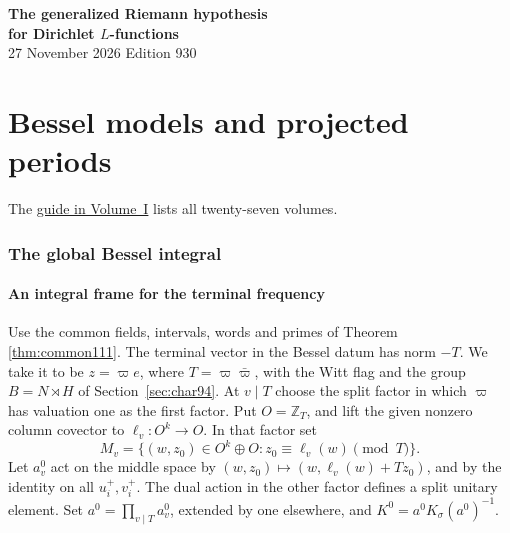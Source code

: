 \documentclass[a4paper,11pt]{article}
\theoremstyle{definition}
\theoremstyle{remark}
\newcommand{\ZZ}{\mathbb Z}\newcommand{\ord}{\operatorname{ord}}
\numberwithin{equation}{section}
\begin{document}
\setcounter{part}{16}
\thispagestyle{plain}\begin{center}
{\LARGE\bfseries The generalized Riemann hypothesis\\[2pt]for Dirichlet \(L\)-functions}\\[6pt]
{\small 27 November 2026 \quad\textperiodcentered\quad Edition 930}\end{center}
\part{Bessel models and projected periods}\label{part:XVII}
\begin{abstract}\noindent We construct Bessel functionals for specified characters and compact types. At split finite places we match sections of complementary ranks. For the prescribed auxiliary type we prove that an archimedean translation close to the identity gives zero on the original spherical rows when its other valuations are at good split primes. We give a different rational translation compatible with every marked exchange and every unmarked integral root. We compute the contribution of the normalized terminal input to the determinant of the signed period image.\end{abstract}
\setcounter{section}{85}
\noindent The \hyperref[seriesguide]{guide in Volume~I} lists all twenty-seven volumes.
\begingroup\small\setlength{\parskip}{0pt}\tableofcontents\endgroup
\clearpage

\section{The global Bessel integral}\label{nav:g-VII-0}\label{nav:volume-XVII}

\subsection{An integral frame for the terminal frequency}\label{nav:VII-00}
\label{sec:middle131}

Use the common fields, intervals, words and primes of
Theorem \ref{thm:common111}.
The terminal vector in the Bessel datum has norm \(-T\). We take
it to be \(z=\varpi e\), where \(T=\varpi\bar\varpi\), with the
Witt flag and the group \(B=N\rtimes H\) of Section~\ref{sec:char94}.
At \(v\mid T\) choose the split factor in which \(\varpi\) has
valuation one as the first factor. Put \(O=\ZZ_T\), and lift the
given nonzero column covector to \(\ell_v:O^k\to O\).
In that factor set
\[
 M_v=\{(w,z_0)\in O^k\oplus O:z_0\equiv\ell_v(w)\pmod T\}.
\]
Let \(a_v^0\) act on the middle space by
\((w,z_0)\mapsto(w,\ell_v(w)+Tz_0)\), and by the identity on
all \(u_i^+,v_i^+\). The dual action in the other factor defines
a split unitary element. Set \(a^0=\prod_{v\mid T}a_v^0\), extended
by one elsewhere, and \(K^0=a^0K_\sigma(a^0)^{-1}\).
\end{document}
